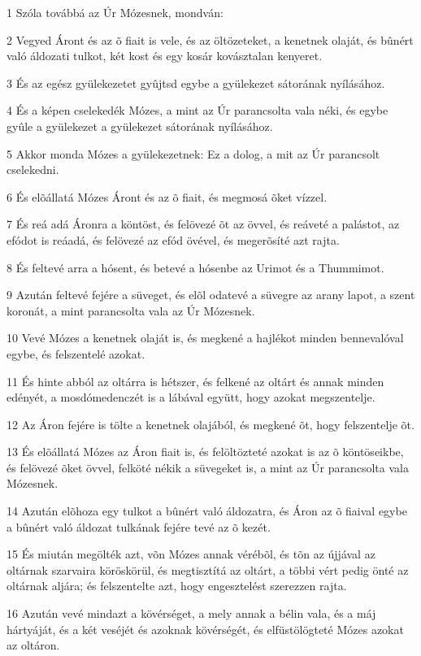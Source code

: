 \par 1 Szóla továbbá az Úr Mózesnek, mondván:
\par 2 Vegyed Áront és az õ fiait is vele, és az öltözeteket, a kenetnek olaját, és bûnért való áldozati tulkot, két kost és egy kosár kovásztalan kenyeret.
\par 3 És az egész gyülekezetet gyûjtsd egybe a gyülekezet sátorának nyílásához.
\par 4 És a képen cselekedék Mózes, a mint az Úr parancsolta vala néki, és egybe gyûle a gyülekezet a gyülekezet sátorának nyílásához.
\par 5 Akkor monda Mózes a gyülekezetnek: Ez a dolog, a mit az Úr parancsolt cselekedni.
\par 6 És elõállatá Mózes Áront és az õ fiait, és megmosá õket vízzel.
\par 7 És reá adá Áronra a köntöst, és felövezé õt az övvel, és reáveté a palástot, az efódot is reáadá, és felövezé az efód övével, és megerõsíté azt rajta.
\par 8 És feltevé arra a hósent, és betevé a hósenbe az Urimot és a Thummimot.
\par 9 Azután feltevé fejére a süveget, és elõl odatevé a süvegre az arany lapot, a szent koronát, a mint parancsolta vala az Úr Mózesnek.
\par 10 Vevé Mózes a kenetnek olaját is, és megkené a hajlékot minden bennevalóval egybe, és felszentelé azokat.
\par 11 És hinte abból az oltárra is hétszer, és felkené az oltárt és annak minden edényét, a mosdómedenczét is a lábával együtt, hogy azokat megszentelje.
\par 12 Az Áron fejére is tölte a kenetnek olajából, és megkené õt, hogy felszentelje õt.
\par 13 És elõállatá Mózes az Áron fiait is, és felöltözteté azokat is az õ köntöseikbe, és felövezé õket övvel, felköté nékik a süvegeket is, a mint az Úr parancsolta vala Mózesnek.
\par 14 Azután elõhoza egy tulkot a bûnért való áldozatra, és Áron az õ fiaival egybe a bûnért való áldozat tulkának fejére tevé az õ kezét.
\par 15 És miután megölték azt, võn Mózes annak vérébõl, és tõn az újjával az oltárnak szarvaira köröskörül, és megtisztítá az oltárt, a többi vért pedig önté az oltárnak aljára; és felszentelte azt, hogy engesztelést szerezzen rajta.
\par 16 Azután vevé mindazt a kövérséget, a mely annak a bélin vala, és a máj hártyáját, és a két veséjét és azoknak kövérségét, és elfüstölögteté Mózes azokat az oltáron.
